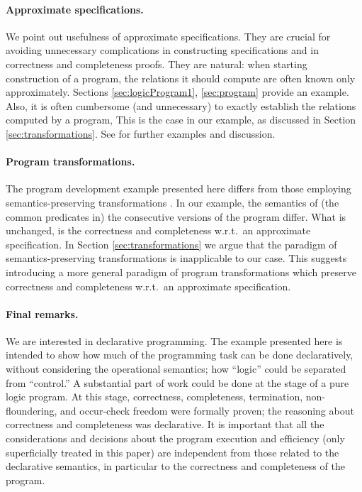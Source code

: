 \documentclass{tlp}
\begin{document}
{\paragraph{Approximate specifications.}
  We point out usefulness of approximate specifications.
They are crucial for avoiding unnecessary
  complications in constructing specifications and in
   correctness and completeness proofs.
  They are natural:  when starting construction of a program, 
  the relations it should compute are often known only approximately.
  Sections \ref{sec:logicProgram1}, \ref{sec:program} provide an example.
Also, it is often cumbersome (and unnecessary) to exactly establish the
  relations computed by a program, 
  This is the case in our example, as discussed in Section
  \ref{sec:transformations}. 
  See \cite{drabent.tocl16} for further examples and discussion.
  

\paragraph{Program transformations.}
The program development example presented here differs from those
employing semantics-preserving transformations
\cite[and the references therein]{PettorossiPS10shorter}.
In our example,
  the semantics of (the common predicates in) the consecutive versions 
of the program differ.  What is unchanged, is the correctness
  and completeness w.r.t.\ an approximate specification.
In Section \ref{sec:transformations}
  we argue that the paradigm of semantics-preserving transformations
  is inapplicable to our case.
  This suggests introducing a more general paradigm of program transformations which 
  preserve correctness and completeness w.r.t.\ an approximate specification.




\paragraph{Final remarks.}
We are interested in declarative programming.
The example presented here
  is intended to show how much of the programming task can be
  done declaratively, 
  without considering the operational semantics; how 
   ``logic'' could be separated from ``control.''  A substantial part of work
  could be done at the stage of a pure logic program.
At this stage, correctness, completeness, termination, non-floundering, and
  occur-check freedom were formally proven;
the reasoning about correctness and completeness was declarative.
  It is important that all the
  considerations and decisions about the program execution and efficiency
  (only superficially treated in this paper) are independent from those related
  to the declarative semantics,
  in particular to the correctness and completeness of the program.





}
\end{document}

